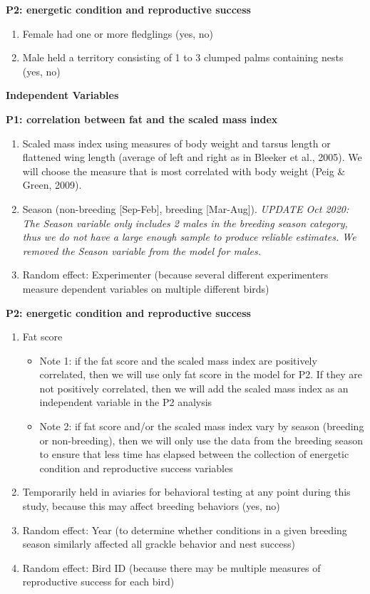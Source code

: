 \documentclass[
]{article}
\providecommand{\tightlist}{%
  \setlength{\itemsep}{0pt}\setlength{\parskip}{0pt}}
\begin{document}
\textbf{P2: energetic condition and reproductive success}

\begin{enumerate}
\def\labelenumi{\arabic{enumi})}
\item
  Female had one or more fledglings (yes, no)
\item
  Male held a territory consisting of 1 to 3 clumped palms containing
  nests (yes, no)
\end{enumerate}

\textbf{Independent Variables}

\textbf{P1: correlation between fat and the scaled mass index}

\begin{enumerate}
\def\labelenumi{\arabic{enumi})}
\item
  Scaled mass index using measures of body weight and tarsus length or
  flattened wing length (average of left and right as in Bleeker et al.,
  2005). We will choose the measure that is most correlated with body
  weight (Peig \& Green, 2009).
\item
  Season (non-breeding {[}Sep-Feb{]}, breeding {[}Mar-Aug{]}).
  \emph{UPDATE Oct 2020: The Season variable only includes 2 males in
  the breeding season category, thus we do not have a large enough
  sample to produce reliable estimates. We removed the Season variable
  from the model for males.}
\item
  Random effect: Experimenter (because several different experimenters
  measure dependent variables on multiple different birds)
\end{enumerate}

\textbf{P2: energetic condition and reproductive success}

\begin{enumerate}
\def\labelenumi{\arabic{enumi})}
\item
  Fat score

  \begin{itemize}
  \tightlist
  \item
    Note 1: if the fat score and the scaled mass index are positively
    correlated, then we will use only fat score in the model for P2. If
    they are not positively correlated, then we will add the scaled mass
    index as an independent variable in the P2 analysis
  \item
    Note 2: if fat score and/or the scaled mass index vary by season
    (breeding or non-breeding), then we will only use the data from the
    breeding season to ensure that less time has elapsed between the
    collection of energetic condition and reproductive success variables
  \end{itemize}
\item
  Temporarily held in aviaries for behavioral testing at any point
  during this study, because this may affect breeding behaviors (yes,
  no)
\item
  Random effect: Year (to determine whether conditions in a given
  breeding season similarly affected all grackle behavior and nest
  success)
\item
  Random effect: Bird ID (because there may be multiple measures of
  reproductive success for each bird)
\end{enumerate}
\end{document}
